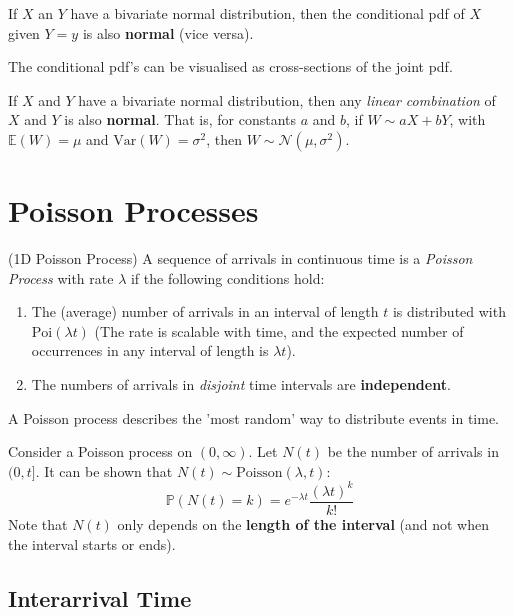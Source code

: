\documentclass{article}
\begin{document}
\begin{theorem}
    If $X$ an $Y$ have a bivariate normal distribution, then the conditional pdf of $X$ given $Y = y$ is also \textbf{normal} (vice versa). 
\end{theorem} The conditional pdf's can be visualised as cross-sections of the joint pdf. 

\begin{theorem}
    If $X$ and $Y$ have a bivariate normal distribution, then any \textit{linear combination} of $X$ and $Y$ is also \textbf{normal}. That is, for constants $a$ and $b$, if $W \sim aX + bY$, with $ \mathbb{E}(W) = \mu$ and $\text{Var}(W) = \sigma^{2}$, then $W \sim \mathcal{N}(\mu, \sigma^{2})$. 
\end{theorem}

\section{Poisson Processes}

\begin{definition}
    (1D Poisson Process) A sequence of arrivals in continuous time is a \textit{Poisson Process} with rate $\lambda$ if the following conditions hold: \begin{enumerate}
        \item The (average) number of arrivals in an interval of length $t$ is distributed with $\text{Poi}(\lambda t)$ (The rate is scalable with time, and the expected number of occurrences in any interval of length is $\lambda t$). 
        \item The numbers of arrivals in \textit{disjoint} time intervals are \textbf{independent}.  
    \end{enumerate}
\end{definition} A Poisson process describes the 'most random' way to distribute events in time. 

\begin{definition}
    Consider a Poisson process on $(0, \infty)$. Let $N(t)$ be the number of arrivals in $(0,t]$. It can be shown that $N(t) \sim \text{Poisson}(\lambda, t)$: \begin{equation}
        \mathbb{P}(N(t) = k) = e^{-\lambda t} \frac{(\lambda t)^{k}}{k!}
    \end{equation} Note that $N(t)$ only depends on the \textbf{length of the interval} (and not when the interval starts or ends). 
\end{definition}

\subsection{Interarrival Time}
\end{document}
